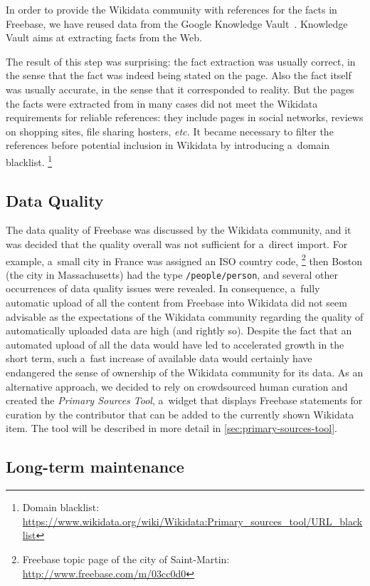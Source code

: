 \documentclass{sig-alternate-2013}
\begin{document}
In order to provide the Wikidata community with references for the facts in Freebase,
we have reused data from the Google
Knowledge Vault~\cite{dong2014knowledge}. Knowledge Vault aims at extracting facts from the Web.

The result of this step was surprising:
the fact extraction was usually correct, in the sense that the fact was indeed being stated on the page.
Also the fact itself was usually accurate, in the sense that it corresponded to reality.
But the pages the facts were extracted from in many cases did not meet
the Wikidata requirements for reliable references:
they include pages in social networks, reviews on shopping sites, file sharing hosters, \emph{etc.}
It became necessary to filter the references before potential inclusion in Wikidata
by introducing a~domain blacklist.%
\footnote{Domain blacklist:
\url{https://www.wikidata.org/wiki/Wikidata:Primary_sources_tool/URL_blacklist}}

\subsection{Data Quality}
\label{sec:dataquality}

The data quality of Freebase was discussed by the Wikidata community, and it
was decided that the quality overall was not sufficient for a~direct import.
For example, a~small city in France was assigned an ISO country code,%
\footnote{Freebase topic page of the city of Saint-Martin: \url{http://www.freebase.com/m/03cc0d0}}
then Boston (the city in Massachusetts) had the type \texttt{/people/person},
and several other occurrences of data quality issues were revealed.
In consequence, a~fully automatic upload of all the content from Freebase into Wikidata
did not seem advisable as the expectations of the Wikidata community regarding the
quality of automatically uploaded data are high (and rightly so).
Despite the fact that an automated upload of all the data
would have led to accelerated growth in the short term,
such a~fast increase of available data would certainly have endangered
the sense of ownership of the Wikidata community for its data.
As an alternative approach, we decided to rely on crowdsourced human curation
and created the \emph{Primary Sources Tool},
a~widget that displays Freebase statements
for curation by the contributor that can be added to the currently shown Wikidata item.
The tool will be described in more detail in \autoref{sec:primary-sources-tool}.

\subsection{Long-term maintenance}
\label{sec:longtermmaintenance}
\end{document}
